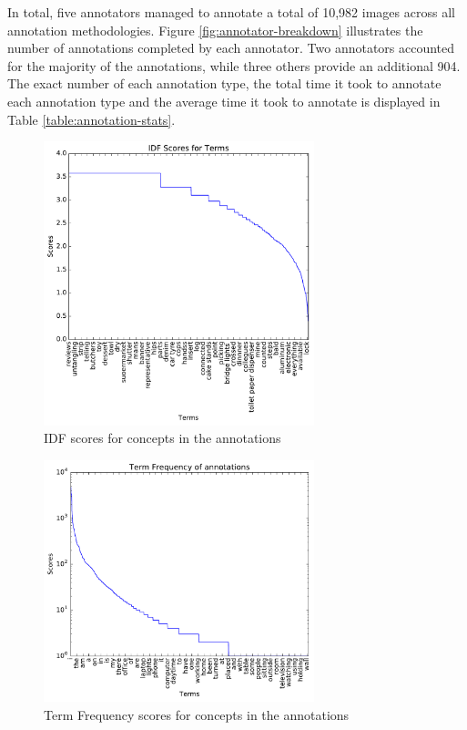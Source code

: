 In total, five annotators managed to annotate a total of 10,982 images across all annotation methodologies. Figure \ref{fig:annotator-breakdown} illustrates the number of annotations completed by each annotator. Two annotators accounted for the majority of the annotations, while three others provide an additional 904. The exact number of each annotation type, the total time it took to annotate each annotation type and the average time it took to annotate is displayed in Table \ref{table:annotation-stats}.

\begin{figure}[b]
    \centering
    \includegraphics[width=0.7\textwidth]{graphs/idf-scores}
    \caption{IDF scores for concepts in the annotations}
    \label{fig:idf-scores}
\end{figure}

\begin{figure}[b]
    \centering
    \includegraphics[width=0.7\textwidth]{graphs/tf-scores}
    \caption{Term Frequency scores for concepts in the annotations}
    \label{fig:tf-scores}
\end{figure}

